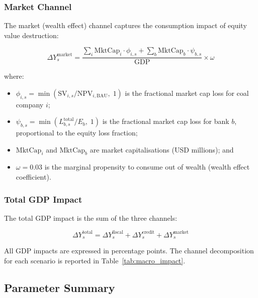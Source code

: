 \subsubsection{Market Channel}

The market (wealth effect) channel captures the consumption impact of equity value destruction:

\begin{equation}
\label{eq:app_market}
\Delta Y^{\text{market}}_s = \frac{\sum_i \text{MktCap}_i \cdot \phi_{i,s} + \sum_b \text{MktCap}_b \cdot \psi_{b,s}}{\text{GDP}} \times \omega
\end{equation}

\noindent where:
\begin{itemize}
    \item $\phi_{i,s} = \min\!\left(\text{SV}_{i,s} / \text{NPV}_{i,\text{BAU}},\; 1\right)$ is the fractional market cap loss for coal company $i$;
    \item $\psi_{b,s} = \min\!\left(L_{b,s}^{\text{total}} / E_b,\; 1\right)$ is the fractional market cap loss for bank $b$, proportional to the equity loss fraction;
    \item $\text{MktCap}_i$ and $\text{MktCap}_b$ are market capitalisations (USD millions); and
    \item $\omega = 0.03$ is the marginal propensity to consume out of wealth (wealth effect coefficient).
\end{itemize}


\subsubsection{Total GDP Impact}

The total GDP impact is the sum of the three channels:

\begin{equation}
\label{eq:app_total_gdp}
\Delta Y_s^{\text{total}} = \Delta Y^{\text{fiscal}}_s + \Delta Y^{\text{credit}}_s + \Delta Y^{\text{market}}_s
\end{equation}

All GDP impacts are expressed in percentage points. The channel decomposition for each scenario is reported in Table~\ref{tab:macro_impact}.


\subsection{Parameter Summary}
\label{subsec:param_summary}

